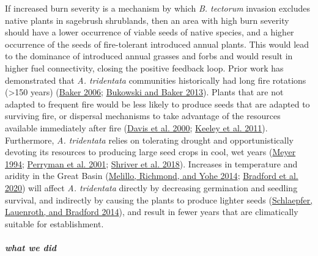 \documentclass[
  12pt,
]{article}
\begin{document}
If increased burn severity is a mechanism by which \emph{B. tectorum}
invasion excludes native plants in sagebrush shrublands, then an area
with high burn severity should have a lower occurrence of viable seeds
of native species, and a higher occurrence of the seeds of fire-tolerant
introduced annual plants. This would lead to the dominance of introduced
annual grasses and forbs and would result in higher fuel connectivity,
closing the positive feedback loop. Prior work has demonstrated that
\emph{A. tridentata} communities historically had long fire rotations
(\textgreater150 years) (\protect\hyperlink{ref-Baker2006}{Baker 2006};
\protect\hyperlink{ref-Bukowski2013}{Bukowski and Baker 2013}). Plants
that are not adapted to frequent fire would be less likely to produce
seeds that are adapted to surviving fire, or dispersal mechanisms to
take advantage of the resources available immediately after fire
(\protect\hyperlink{ref-Davis2000}{Davis et al. 2000};
\protect\hyperlink{ref-Keeley2011}{Keeley et al. 2011}). Furthermore,
\emph{A. tridentata} relies on tolerating drought and opportunistically
devoting its resources to producing large seed crops in cool, wet years
(\protect\hyperlink{ref-Meyer1994}{Meyer 1994};
\protect\hyperlink{ref-Perryman2001}{Perryman et al. 2001};
\protect\hyperlink{ref-Shriver2018}{Shriver et al. 2018}). Increases in
temperature and aridity in the Great Basin
(\protect\hyperlink{ref-Melillo2014}{Melillo, Richmond, and Yohe 2014};
\protect\hyperlink{ref-Bradford2020}{Bradford et al. 2020}) will affect
\emph{A. tridentata} directly by decreasing germination and seedling
survival, and indirectly by causing the plants to produce lighter seeds
(\protect\hyperlink{ref-Schlaepfer2014}{Schlaepfer, Lauenroth, and
Bradford 2014}), and result in fewer years that are climatically
suitable for establishment.

\hypertarget{what-we-did}{%
\subparagraph{what we did}\label{what-we-did}}
\end{document}
